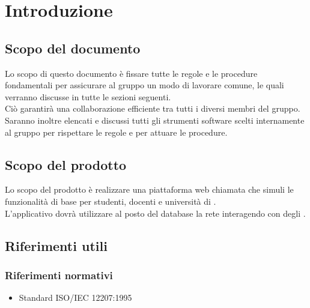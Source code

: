 \documentclass[NormeDiProgetto.tex]{subfiles}
\begin{document}
\chapter{Introduzione}

\section{Scopo del documento}
Lo scopo di questo documento è fissare tutte le regole e le procedure fondamentali per assicurare al gruppo un modo di lavorare comune, le quali verranno discusse in tutte le sezioni seguenti.\\
Ciò garantirà una collaborazione efficiente tra tutti i diversi membri del gruppo.\\
Saranno inoltre elencati e discussi tutti gli strumenti software scelti internamente al gruppo per rispettare le regole e per attuare le procedure.

\section{Scopo del prodotto}
Lo scopo del prodotto è realizzare una piattaforma web chiamata \progetto che simuli le funzionalità di base per studenti, docenti e università di .\\
L'applicativo dovrà utilizzare al posto del database la rete  interagendo con degli .

\glossExpl

\section{Riferimenti utili}
\subsection{Riferimenti normativi}
\begin{itemize}
	\item Standard ISO/IEC 12207:1995\\ 
\end{itemize}
\end{document}
